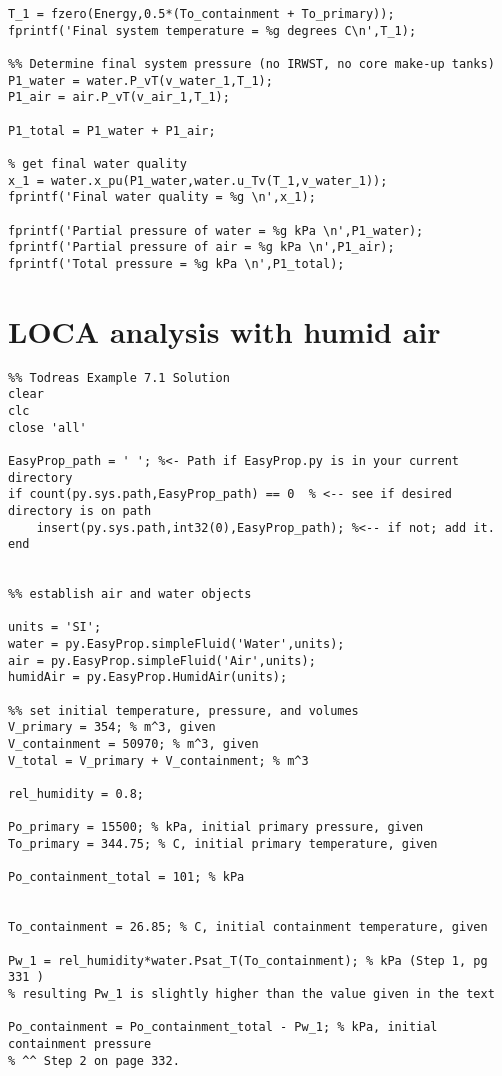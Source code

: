 \begin{fullwidth}
\begin{lstlisting}
T_1 = fzero(Energy,0.5*(To_containment + To_primary));
fprintf('Final system temperature = %g degrees C\n',T_1);

%% Determine final system pressure (no IRWST, no core make-up tanks)
P1_water = water.P_vT(v_water_1,T_1);
P1_air = air.P_vT(v_air_1,T_1);

P1_total = P1_water + P1_air;

% get final water quality
x_1 = water.x_pu(P1_water,water.u_Tv(T_1,v_water_1));
fprintf('Final water quality = %g \n',x_1);

fprintf('Partial pressure of water = %g kPa \n',P1_water);
fprintf('Partial pressure of air = %g kPa \n',P1_air);
fprintf('Total pressure = %g kPa \n',P1_total);

\end{lstlisting}


\section{LOCA analysis with humid air}

\begin{lstlisting}
%% Todreas Example 7.1 Solution
clear
clc
close 'all'

EasyProp_path = ' '; %<- Path if EasyProp.py is in your current directory
if count(py.sys.path,EasyProp_path) == 0  % <-- see if desired directory is on path
    insert(py.sys.path,int32(0),EasyProp_path); %<-- if not; add it.
end


%% establish air and water objects

units = 'SI';
water = py.EasyProp.simpleFluid('Water',units);
air = py.EasyProp.simpleFluid('Air',units);
humidAir = py.EasyProp.HumidAir(units);

%% set initial temperature, pressure, and volumes
V_primary = 354; % m^3, given
V_containment = 50970; % m^3, given
V_total = V_primary + V_containment; % m^3

rel_humidity = 0.8;

Po_primary = 15500; % kPa, initial primary pressure, given
To_primary = 344.75; % C, initial primary temperature, given

Po_containment_total = 101; % kPa 


To_containment = 26.85; % C, initial containment temperature, given

Pw_1 = rel_humidity*water.Psat_T(To_containment); % kPa (Step 1, pg 331 )
% resulting Pw_1 is slightly higher than the value given in the text

Po_containment = Po_containment_total - Pw_1; % kPa, initial containment pressure
% ^^ Step 2 on page 332.


\end{lstlisting}
\end{fullwidth}
